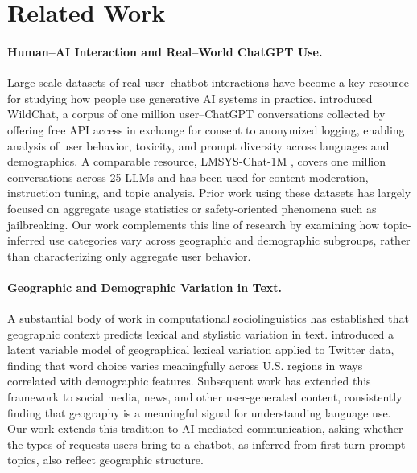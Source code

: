 \documentclass[11pt]{article}
\begin{document}
\section{Related Work}

\paragraph{Human--AI Interaction and Real--World ChatGPT Use.}

Large-scale datasets of real user--chatbot interactions have become a key resource for studying how people use generative AI systems in practice. \citet{zhao2024wildchat} introduced WildChat, a corpus of one million user--ChatGPT conversations collected by offering free API access in exchange for consent to anonymized logging, enabling analysis of user behavior, toxicity, and prompt diversity across languages and demographics. A comparable resource, LMSYS-Chat-1M \citep{zheng2024lmsys}, covers one million conversations across 25 LLMs and has been used for content moderation, instruction tuning, and topic analysis. Prior work using these datasets has largely focused on aggregate usage statistics or safety-oriented phenomena such as jailbreaking. Our work complements this line of research by examining how topic-inferred use categories vary across geographic and demographic subgroups, rather than characterizing only aggregate user behavior.

\paragraph{Geographic and Demographic Variation in Text.}

A substantial body of work in computational sociolinguistics has established that geographic context predicts lexical and stylistic variation in text. \citet{eisenstein2010latent} introduced a latent variable model of geographical lexical variation applied to Twitter data, finding that word choice varies meaningfully across U.S. regions in ways correlated with demographic features. Subsequent work has extended this framework to social media, news, and other user-generated content, consistently finding that geography is a meaningful signal for understanding language use. Our work extends this tradition to AI-mediated communication, asking whether the types of requests users bring to a chatbot, as inferred from first-turn prompt topics, also reflect geographic structure.
\end{document}
